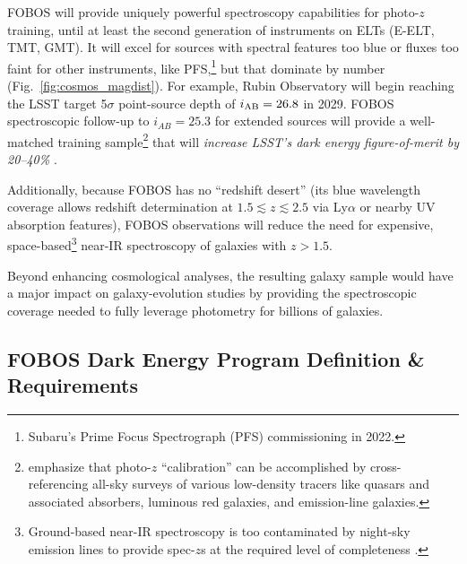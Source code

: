 \documentclass[11pt,a4paper,twoside,onecolumn,openany,final,oldfontcommands]{memoir}
\begin{document}

FOBOS will provide uniquely powerful spectroscopy capabilities for photo-$z$ training, until at least the second generation of instruments on ELTs (E-ELT, TMT, GMT).  It will excel for sources with spectral features too blue or fluxes too faint for other instruments, like PFS,\footnote{Subaru's Prime Focus Spectrograph (PFS) commissioning in 2022.} but that dominate by number (Fig.~\ref{fig:cosmos_magdist}).  For example, Rubin Observatory will begin reaching the LSST target 5$\sigma$ point-source depth of $i_{\rm AB} = 26.8$ in 2029.   FOBOS spectroscopic follow-up to $i_{AB} = 25.3$ for extended sources will provide a well-matched training sample\footnote{\citet{newman15} emphasize that photo-$z$ ``calibration'' can be accomplished by cross-referencing all-sky surveys of various low-density tracers like quasars and associated absorbers, luminous red galaxies, and emission-line galaxies.} that will \textit{increase LSST's dark energy figure-of-merit by 20--40\%} \citep{newman15}.


 Additionally, because FOBOS has no ``redshift desert'' (its blue wavelength coverage allows redshift determination at $1.5\lesssim z \lesssim2.5$ via Ly$\alpha$ or nearby UV absorption features), FOBOS observations will reduce the need for expensive, space-based\footnote{Ground-based near-IR spectroscopy is too contaminated by night-sky emission lines to provide spec-$z$s at the required level of completeness \citep{newman15}.} near-IR spectroscopy of galaxies with $z > 1.5$.  

 Beyond enhancing cosmological analyses, the resulting galaxy sample would have a major impact on galaxy-evolution studies by providing the spectroscopic coverage needed to fully leverage photometry for billions of galaxies.  %


\subsection{FOBOS Dark Energy Program Definition \& Requirements}
\end{document}

